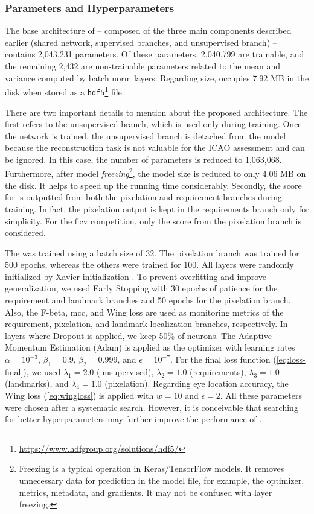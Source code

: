 \subsubsection{Parameters and Hyperparameters} \label{sec:hyperparams}
 
The base architecture of \methodname -- composed of the three main components described earlier (shared network, supervised branches, and unsupervised branch) -- contains 2,043,231 parameters. Of these parameters, 2,040,799 are trainable, and the remaining 2,432 are non-trainable parameters related to the mean and variance computed by batch norm layers. Regarding size, \methodname occupies 7.92 MB in the disk when stored as a \texttt{hdf5}\footnote{\url{https://www.hdfgroup.org/solutions/hdf5/}} file.
 
There are two important details to mention about the proposed architecture. The first refers to the unsupervised branch, which is used only during training. Once the network is trained, the unsupervised branch is detached from the model because the reconstruction task is not valuable for the ICAO assessment and can be ignored. In this case, the number of parameters is reduced to 1,063,068. Furthermore, after model \textit{freezing}\footnote{Freezing is a typical operation in Keras/TensorFlow models. It removes unnecessary data for prediction in the model file, for example, the optimizer, metrics, metadata, and gradients. It may not be confused with layer freezing.}, the model size is reduced to only 4.06 MB on the disk. It helps to speed up the running time considerably. Secondly, the score for \pixelation is outputted from both the pixelation and requirement branches during training. In fact, the pixelation output is kept in the requirements branch only for simplicity. For the \acs{ficv} competition, only the score from the pixelation branch is considered.
 
The \methodname was trained using a batch size of 32. The pixelation branch was trained for 500 epochs, whereas the others were trained for 100. All layers were randomly initialized by Xavier initialization \citep{glorot2010understanding}. To prevent overfitting and improve generalization, we used Early Stopping with 30 epochs of patience for the requirement and landmark branches and 50 epochs for the pixelation branch. Also, the F-beta, \acs{mcc}, and Wing loss are used as monitoring metrics of the requirement, pixelation, and landmark localization branches, respectively. In layers where Dropout is applied, we keep 50\% of neurons. The Adaptive Momentum Estimation (Adam) is applied as the optimizer with learning rates $\alpha=10^{-3}$, $\beta_1=0.9$, $\beta_2=0.999$, and $\epsilon=10^{-7}$. For the final loss function (\autoref{eq:loss-final}), we used $\lambda_1=2.0$ (unsupervised), $\lambda_2=1.0$ (requirements), $\lambda_3=1.0$ (landmarks), and $\lambda_4=1.0$ (pixelation). Regarding eye location accuracy, the Wing loss (\autoref{eq:wingloss}) is applied with $w = 10$ and $\epsilon = 2$. All these parameters were chosen after a systematic search. However, it is conceivable that searching for better hyperparameters may further improve the performance of \methodname.
 
 
 